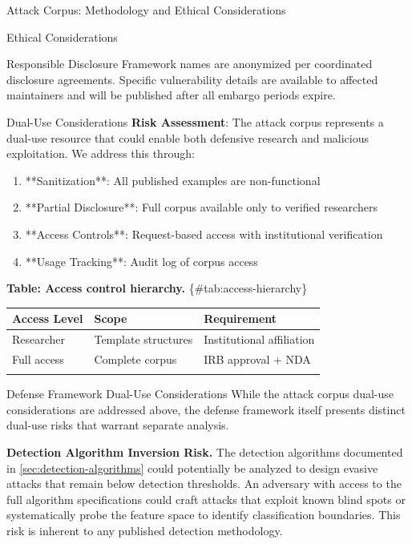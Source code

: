 \documentclass[
  ignorenonframetext,
]{beamer}
\newcounter{none} %
\begin{document}
\begin{frame}{Attack Corpus: Methodology and Ethical Considerations}
\begin{block}{Ethical Considerations}
\begin{block}{Responsible Disclosure}
Framework names are anonymized per coordinated disclosure agreements.
Specific vulnerability details are available to affected maintainers and
will be published after all embargo periods expire.
\end{block}

\begin{block}{Dual-Use Considerations}
\protect{}\label{sec:dual-use}
\textbf{Risk Assessment}: The attack corpus represents a dual-use
resource that could enable both defensive research and malicious
exploitation. We address this through:

\begin{enumerate}
\item **Sanitization**: All published examples are non-functional
\item **Partial Disclosure**: Full corpus available only to verified researchers
\item **Access Controls**: Request-based access with institutional verification
\item **Usage Tracking**: Audit log of corpus access
\end{enumerate}

\textbf{Table: Access control hierarchy.} \{\#tab:access-hierarchy\}

{\def\LTcaptype{none} %
\begin{longtable}[]{@{}lll@{}}
\toprule\noalign{}
Access Level & Scope & Requirement \\
\midrule\noalign{}
\endhead
Researcher & Template structures & Institutional affiliation \\
Full access & Complete corpus & IRB approval + NDA \\
\bottomrule\noalign{}
\end{longtable}
}
\end{block}

\begin{block}{Defense Framework Dual-Use Considerations}
\protect{}\label{sec:defense-dual-use}
While the attack corpus dual-use considerations are addressed above, the
defense framework itself presents distinct dual-use risks that warrant
separate analysis.

\textbf{Detection Algorithm Inversion Risk.} The detection algorithms
documented in \cref{sec:detection-algorithms} could potentially be
analyzed to design evasive attacks that remain below detection
thresholds. An adversary with access to the full algorithm
specifications could craft attacks that exploit known blind spots or
systematically probe the feature space to identify classification
boundaries. This risk is inherent to any published detection
methodology.


\end{block}
\end{block}
\end{frame}
\end{document}

